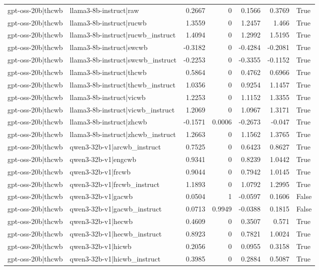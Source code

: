 \begin{table}
\begin{tabular}{l l r r r r l}
gpt-oss-20b|thcwb & llama3-8b-instruct|raw & 0.2667 & 0 & 0.1566 & 0.3769 & True \\
gpt-oss-20b|thcwb & llama3-8b-instruct|rucwb & 1.3559 & 0 & 1.2457 & 1.466 & True \\
gpt-oss-20b|thcwb & llama3-8b-instruct|rucwb_instruct & 1.4094 & 0 & 1.2992 & 1.5195 & True \\
gpt-oss-20b|thcwb & llama3-8b-instruct|swcwb & -0.3182 & 0 & -0.4284 & -0.2081 & True \\
gpt-oss-20b|thcwb & llama3-8b-instruct|swcwb_instruct & -0.2253 & 0 & -0.3355 & -0.1152 & True \\
gpt-oss-20b|thcwb & llama3-8b-instruct|thcwb & 0.5864 & 0 & 0.4762 & 0.6966 & True \\
gpt-oss-20b|thcwb & llama3-8b-instruct|thcwb_instruct & 1.0356 & 0 & 0.9254 & 1.1457 & True \\
gpt-oss-20b|thcwb & llama3-8b-instruct|vicwb & 1.2253 & 0 & 1.1152 & 1.3355 & True \\
gpt-oss-20b|thcwb & llama3-8b-instruct|vicwb_instruct & 1.2069 & 0 & 1.0967 & 1.3171 & True \\
gpt-oss-20b|thcwb & llama3-8b-instruct|zhcwb & -0.1571 & 0.0006 & -0.2673 & -0.047 & True \\
gpt-oss-20b|thcwb & llama3-8b-instruct|zhcwb_instruct & 1.2663 & 0 & 1.1562 & 1.3765 & True \\
gpt-oss-20b|thcwb & qwen3-32b-v1|arcwb_instruct & 0.7525 & 0 & 0.6423 & 0.8627 & True \\
gpt-oss-20b|thcwb & qwen3-32b-v1|engcwb & 0.9341 & 0 & 0.8239 & 1.0442 & True \\
gpt-oss-20b|thcwb & qwen3-32b-v1|frcwb & 0.9044 & 0 & 0.7942 & 1.0145 & True \\
gpt-oss-20b|thcwb & qwen3-32b-v1|frcwb_instruct & 1.1893 & 0 & 1.0792 & 1.2995 & True \\
gpt-oss-20b|thcwb & qwen3-32b-v1|gacwb & 0.0504 & 1 & -0.0597 & 0.1606 & False \\
gpt-oss-20b|thcwb & qwen3-32b-v1|gacwb_instruct & 0.0713 & 0.9949 & -0.0388 & 0.1815 & False \\
gpt-oss-20b|thcwb & qwen3-32b-v1|hecwb & 0.4609 & 0 & 0.3507 & 0.571 & True \\
gpt-oss-20b|thcwb & qwen3-32b-v1|hecwb_instruct & 0.8923 & 0 & 0.7821 & 1.0024 & True \\
gpt-oss-20b|thcwb & qwen3-32b-v1|hicwb & 0.2056 & 0 & 0.0955 & 0.3158 & True \\
gpt-oss-20b|thcwb & qwen3-32b-v1|hicwb_instruct & 0.3985 & 0 & 0.2884 & 0.5087 & True \\

\end{tabular}
\end{table}
